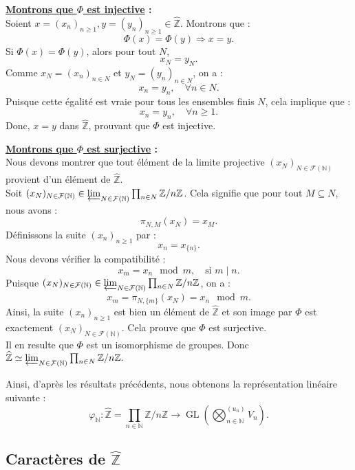\documentclass[a4paper, 14pt]{report}
\newcommand{\divides}{\mid}
\begin{document}
\begin{onehalfspace}
{			\textbf{\underline{Montrons que $\Phi$ est injective} :}\\
			Soient $x=(x_n)_{n \geq 1}, y=(y_n)_{n \geq 1} \in \widehat{\mathbb{Z}}$.
			Montrons que :
			\[
			\Phi(x) = \Phi(y) \Rightarrow x = y.
			\]
			Si $\Phi(x) = \Phi(y)$, alors pour tout $N$,
			\[
			x_N = y_N.
			\]
			Comme $x_N = (x_n)_{n \in N}$ et $y_N = (y_n)_{n \in N}$, on a :
			\[
			x_n = y_n, \quad \forall n \in N.
			\]
			Puisque cette égalité est vraie pour tous les ensembles finis $N$, cela implique que :
			\[
			x_n = y_n, \quad \forall n \geq 1.
			\]
			Donc, $x = y$ dans $\widehat{\mathbb{Z}}$, prouvant que $\Phi$ est injective.
			
			\textbf{\underline{Montrons que $\Phi$ est surjective} :}\\
			Nous devons montrer que tout élément de la limite projective $(x_N)_{N \in \mathcal{F}(\mathbb{N})}$ provient d’un élément de $\widehat{\mathbb{Z}}$.\\
			Soit $(x_N)_{N \in \mathcal{F}(\mathbb{N})} \in \varprojlim_{N \in \mathcal{F}(\mathbb{N})} \prod_{n \in N} \mathbb{Z}/n\mathbb{Z}$. Cela signifie que pour tout $M \subseteq N$, nous avons :
			\[
			\pi_{N,M}(x_N) = x_M.
			\]
			Définissons la suite $(x_n)_{n \geq 1}$ par :
			\[
			x_n = x_{\{n\}}.
			\]
			Nous devons vérifier la compatibilité :
			\[
			x_m = x_n \mod m, \quad \text{si } m \divides n.
			\]
			Puisque $(x_N)_{N \in \mathcal{F}(\mathbb{N})} \in \varprojlim_{N \in \mathcal{F}(\mathbb{N})} \prod_{n \in N} \mathbb{Z}/n\mathbb{Z}$, on a :
			\[
			x_m = \pi_{N,\{m\}}(x_N) = x_n \mod m.
			\]
			Ainsi, la suite $(x_n)_{n \geq 1}$ est bien un élément de $\widehat{\mathbb{Z}}$ et son image par $\Phi$ est exactement $(x_N)_{N \in \mathcal{F}(\mathbb{N})}$.
			Cela prouve que $\Phi$ est surjective.\\
			Il en resulte que $\Phi$ est un isomorphisme de groupes. Donc
			\(
			\widehat{\mathbb{Z}} \simeq \varprojlim_{N \in \mathcal{F}(\mathbb{N})} \prod_{n \in N} \mathbb{Z}/n\mathbb{Z}.
			\)
			
			Ainsi, d’après les résultats précédents, nous obtenons la représentation linéaire suivante :
			\[
			\varphi_{\mathbb{N}} : \widehat{\mathbb{Z}} = \prod_{n \in \mathbb{N}} \mathbb{Z}/n\mathbb{Z} \longrightarrow \operatorname{GL} \left( \bigotimes^{(u_n)}_{n \in \mathbb{N}} V_n \right).
			\]
			
			
			\subsection{Caractères de $\widehat{\mathbb{Z}}$}
			
}
\end{onehalfspace}
\end{document}
